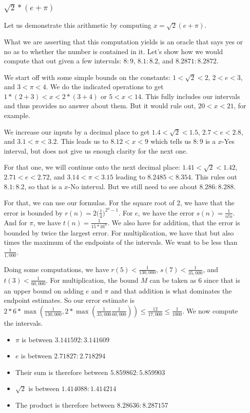 \documentclass[12pt]{article}
\theoremstyle{remark}
\begin{document}
\subsubsection{$\sqrt{2}*(e + \pi)$}

Let us demonstrate this arithmetic by computing $x = \sqrt{2}(e + \pi)$. 

What we are asserting that this computation yields is an oracle that says yes or no as to whether the number is contained in it. Let's show how we would compute that out given a few intervals:  $8:9$, $8.1:8.2$, and $8.2871:8.2872$.

We start off with some simple bounds on the constants: $1 < \sqrt{2} < 2$, $2<e<3$, and $3 < \pi<4$. We do the indicated operations to get $1*(2+3) < x < 2*(3+4)$ or $5 < x< 14$. This fully includes our intervals and thus provides no answer about them. But it would rule out, $20 < x< 21$, for example. 

We increase our inputs by a decimal place to get $1.4 < \sqrt{2} < 1.5$, $2.7<e<2.8$, and $3.1 < \pi<3.2$. This leads us to $8.12 < x < 9$ which tells us $8:9$ is a $x$-Yes interval, but does not give us enough clarity for the next one. 

For that one, we will continue onto the next decimal place: $1.41 < \sqrt{2} < 1.42$, $2.71<e<2.72$, and $3.14 < \pi<3.15$ leading to $8.2485 < 8.354$. This rules out $8.1:8.2$, so that is a $x$-No interval. But we still need to see about $8.286:8.288$.

For that, we can use our formulas. For the square root of 2, we have that the error is bounded by $r(n) = 2\big(\frac{1}{4}\big)^{2^n-1}$. For $e$, we have the error $s(n) = \frac{1}{n!n}$. And for $\pi$, we have $t(n) = \frac{1}{15 * 16^n}$. We also have for addition, that the error is bounded by twice the largest error. For multiplication, we have that but also times the maximum of the endpoints of the intervals. We want to be less than $\frac{1}{1,000}$. 

Doing some computations, we have $r(5) < \frac{1}{130,000}$, $s(7) < \frac{1}{35,000}$, and $t(3) < \frac{1}{60,000}$. For multiplication, the bound $M$ can be taken as 6 since that is an upper bound on adding $e$ and $\pi$ and that addition is what dominates the endpoint estimates. So our error estimate is $2*6*\max(\frac{1}{130,000}, 2*\max(\frac{1}{35,000}\frac{1}{60,000})) \leq \frac{12}{17,000} \leq \frac{1}{1000}$. We now compute the intervals.  

\begin{itemize}
    \item $\pi$ is between $3.141592:3.141609$
    \item $e$ is between $2.71827:2.718294$
    \item Their sum is therefore between $5.859862:5.859903$
    \item $\sqrt{2}$ is between $1.414088:1.414214$
    \item The product is therefore between $8.28636:8.287157$
\end{itemize}
\end{document}
